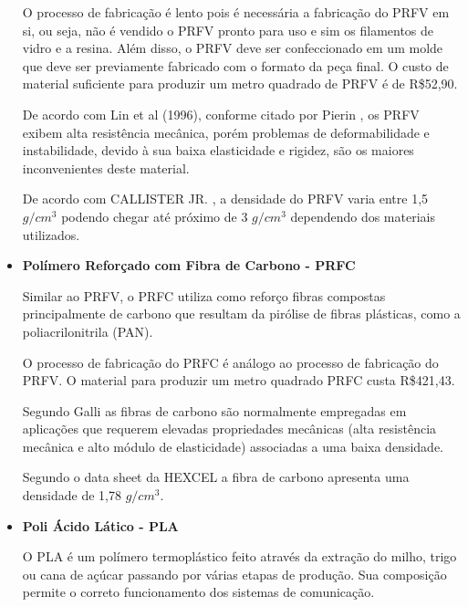 \begin{itemize}
    \par O processo de fabricação é lento pois é necessária a fabricação do PRFV em si, ou seja, não é vendido o PRFV pronto para uso e sim os filamentos de vidro e a resina. Além disso, o PRFV deve ser confeccionado em um molde que deve ser previamente fabricado com o formato da peça final. O custo de material suficiente para produzir um metro quadrado de PRFV é de R\$52,90.  
    
    \par De acordo com Lin et al (1996), conforme citado por Pierin \cite{pierin2005estudo}, os PRFV exibem alta resistência mecânica, porém problemas de deformabilidade e instabilidade, devido à sua baixa elasticidade e rigidez, são os maiores inconvenientes deste material. 
    
    \par De acordo com CALLISTER JR. \cite{callister2000ciencia}, a densidade do PRFV varia entre 1,5 $g/cm^3$ podendo chegar até próximo de 3 $g/cm^3$ dependendo dos materiais utilizados.
    
    \item \textbf{Polímero Reforçado com Fibra de Carbono - PRFC}
    \par Similar ao PRFV, o PRFC utiliza como reforço fibras compostas principalmente de carbono que resultam da pirólise de fibras plásticas, como a poliacrilonitrila (PAN). 
    
    \par O processo de fabricação do PRFC é análogo ao processo de fabricação do PRFV. O material para produzir um metro quadrado PRFC custa R\$421,43.
    
    \par Segundo Galli \cite{galli2016caracterizaccao} as fibras de carbono são normalmente empregadas em aplicações que requerem elevadas propriedades mecânicas (alta resistência mecânica e alto módulo de elasticidade) associadas a uma baixa densidade.
    
    \par Segundo o data sheet da HEXCEL a fibra de carbono apresenta uma densidade de 1,78 $g/cm^3$. \cite{datasheet_carbon}
    
    \item \textbf{Poli Ácido Lático - PLA}
    
    \par O PLA é um polímero termoplástico feito através da extração do milho, trigo ou cana de açúcar passando por várias etapas de produção. Sua composição permite o correto funcionamento dos sistemas de comunicação. 
    

\end{itemize}
